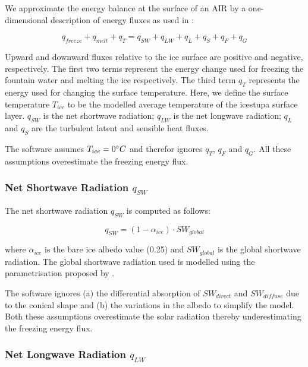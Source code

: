\documentclass[utf8]{frontiersSCNS}
\begin{document}
We approximate the energy balance at the surface of an AIR by a one-dimensional description of energy fluxes as
used in \cite{Balasubramanian_2022}:

\begin{equation}
	 q_{freeze} + q_{melt} + q_{T}= q_{SW} + q_{LW} + q_{L} + q_{S} + q_{F} + q_{G}
	\label{eqn:EB}
\end{equation}

Upward and downward fluxes relative to the ice surface are positive and negative, respectively. The first two
terms represent the energy change used for freezing the fountain water and melting the ice respectively. The
third term $q_{T}$ represents the energy used for changing the surface temperature. Here, we define the surface
temperature $T_{ice}$ to be the modelled average temperature of the icestupa surface layer. $q_{SW}$ is the net
shortwave radiation; $q_{LW}$ is the net longwave radiation; $q_{L}$ and $q_{S}$ are the turbulent latent and
sensible heat fluxes. 

The software assumes $T_{ice} = 0 \degree C$ and therefor ignores $q_{T}$, $q_{F}$ and $q_{G}$. All these
assumptions overestimate the freezing energy flux.

\subsubsection{Net Shortwave Radiation \texorpdfstring{$q_{SW}$}{Lg}} \label{sec:SW}

The net shortwave radiation $q_{SW}$ is computed as follows:

\begin{equation} q_{SW} = (1- \alpha_{ice})\cdot SW_{global} \label{eqn:SW} \end{equation}

where $\alpha_{ice}$ is the bare ice albedo value (0.25) and $SW_{global}$ is the global shortwave radiation.
The global shortwave radiation used is modelled using the parametrisation proposed by \cite{Woolf_1968}.

The software ignores (a) the differential absorption of $SW_{direct}$ and $SW_{diffuse}$ due to the conical
shape and (b) the variations in the albedo to simplify the model. Both these assumptions overestimate the solar
radiation thereby underestimating the freezing energy flux.

\subsubsection{Net Longwave Radiation \texorpdfstring{$q_{LW}$}{Lg}} \label{sec:LW}
\end{document}
